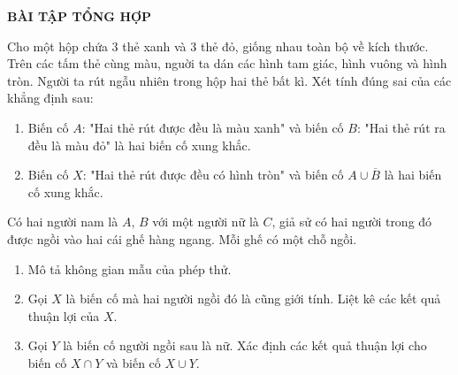 \begin{center}
\textbf{BÀI TẬP TỔNG HỢP}
\end{center}

\begin{bt}%
Cho một hộp chứa $3$ thẻ xanh và $3$ thẻ đỏ, giống nhau toàn bộ về kích thước. Trên các tấm thẻ cùng màu, nguời ta dán các hình tam giác, hình vuông và hình tròn. Người ta rút ngẫu nhiên trong hộp hai thẻ bất kì. Xét tính đúng sai của các khẳng định sau:
\begin{enumerate}
	\item Biến cố $A$: "Hai thẻ rút được đều là màu xanh" và biến cố $B$: "Hai thẻ rút ra đều là màu đỏ" là hai biến cố xung khắc.
	\item Biến cố $X$: "Hai thẻ rút được đều có hình tròn" và biến cố $A\cup \overline{B}$ là hai biến cố xung khắc.
\end{enumerate}
\end{bt}
\begin{bt}%
Có hai người nam là $A$, $B$ với một người nữ là $C$, giả sử có hai người trong đó được ngồi vào hai cái ghế hàng ngang. Mỗi ghế có một chỗ ngồi.
\begin{enumerate}
	\item Mô tả không gian mẫu của phép thử.
	\item Gọi $X$ là biến cố mà hai người ngồi đó là cũng giới tính. Liệt kê các kết quả thuận lợi của $X$.
	\item Gọi $Y$ là biến cố người ngồi sau là nữ. Xác định các kết quả thuận lợi cho biến cố $X\cap Y$ và biến cố $X\cup Y$.
\end{enumerate}	
\end{bt}
